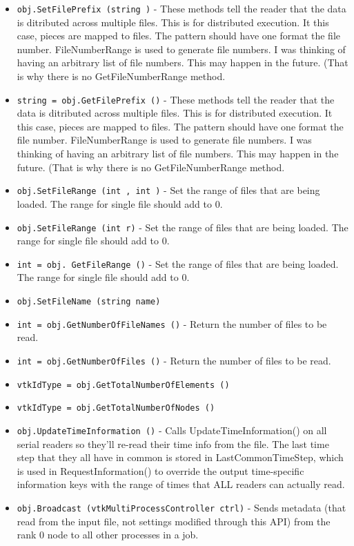 \begin{itemize}
\item  \verb|obj.SetFilePrefix (string )| -  These methods tell the reader that the data is ditributed across
 multiple files. This is for distributed execution. It this case,
 pieces are mapped to files. The pattern should have one %
 format the file number. FileNumberRange is used to generate file
 numbers. I was thinking of having an arbitrary list of file
 numbers. This may happen in the future. (That is why there is no
 GetFileNumberRange method.

\item  \verb|string = obj.GetFilePrefix ()| -  These methods tell the reader that the data is ditributed across
 multiple files. This is for distributed execution. It this case,
 pieces are mapped to files. The pattern should have one %
 format the file number. FileNumberRange is used to generate file
 numbers. I was thinking of having an arbitrary list of file
 numbers. This may happen in the future. (That is why there is no
 GetFileNumberRange method.

\item  \verb|obj.SetFileRange (int , int )| -  Set the range of files that are being loaded. The range for single
 file should add to 0.

\item  \verb|obj.SetFileRange (int r)| -  Set the range of files that are being loaded. The range for single
 file should add to 0.

\item  \verb|int = obj. GetFileRange ()| -  Set the range of files that are being loaded. The range for single
 file should add to 0.

\item  \verb|obj.SetFileName (string name)|

\item  \verb|int = obj.GetNumberOfFileNames ()| -    Return the number of files to be read.

\item  \verb|int = obj.GetNumberOfFiles ()| -    Return the number of files to be read.

\item  \verb|vtkIdType = obj.GetTotalNumberOfElements ()|

\item  \verb|vtkIdType = obj.GetTotalNumberOfNodes ()|

\item  \verb|obj.UpdateTimeInformation ()| -  Calls UpdateTimeInformation() on all serial readers so they'll re-read
 their time info from the file. 
 The last time step that they all have in common
 is stored in LastCommonTimeStep, which is used in RequestInformation()
 to override the output time-specific information keys with the range
 of times that ALL readers can actually read.

\item  \verb|obj.Broadcast (vtkMultiProcessController ctrl)| -  Sends metadata (that read from the input file, not settings modified
 through this API) from the rank 0 node to all other processes in a job.

\end{itemize}
